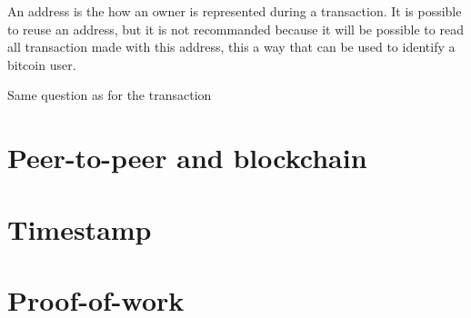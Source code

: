 \documentclass[letterpaper]{article}
\begin{document}
An address is the how an owner is represented during a transaction.
It is possible to reuse an address, but it is not recommanded because
it will be possible to read all transaction made with this address, this
a way that can be used to identify a bitcoin user.

Same question as for the transaction


\section{Peer-to-peer and blockchain}

\section{Timestamp}

\section{Proof-of-work}
\end{document}
